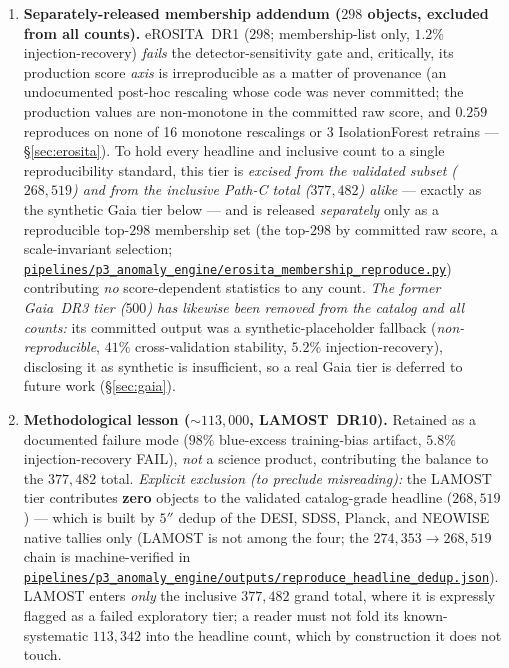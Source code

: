 \documentclass[aps,prd,twocolumn,superscriptaddress,showpacs,preprintnumbers,nofootinbib,longbibliography,floatfix]{revtex4-2}
\newcommand{\repoBase}{https://github.com/Hubify-Projects/bigbounce/blob/main}
\newcommand{\artifact}[1]{\href{\repoBase/#1}{\nolinkurl{#1}}}
\begin{document}
\begin{enumerate}[leftmargin=1.4em,topsep=2pt,itemsep=1pt]
over-representation, binomial $p = 5.5\times10^{-4}$, ruling out in-sample memorization inflation; see \S\ref{sec:planck} and the same held-out artifact), and NEOWISE (masking-geometry QA only, not a detector-sensitivity test; geometry-QA only, not detector-sensitivity injection test). \emph{These are the only numbers we recommend for downstream science.} No component here is claimed as an injection-recovery PASS unless explicitly stated (SDSS, Planck and DESI --- the last for its broad/extended anomaly class only --- are).
\item \textbf{Separately-released membership addendum ($298$ objects, excluded from all counts).} eROSITA~DR1 ($298$; membership-list only, $1.2\%$ injection-recovery) \emph{fails} the detector-sensitivity gate and, critically, its production score \emph{axis} is irreproducible as a matter of provenance (an undocumented post-hoc rescaling whose code was never committed; the production values are non-monotone in the committed raw score, and $0.259$ reproduces on none of 16 monotone rescalings or 3 IsolationForest retrains --- \S\ref{sec:erosita}). To hold every headline and inclusive count to a single reproducibility standard, this tier is \emph{excised from the validated subset ($268{,}519$) and from the inclusive Path-C total ($377{,}482$) alike} --- exactly as the synthetic Gaia tier below --- and is released \emph{separately} only as a reproducible top-$298$ membership set (the top-$298$ by committed raw score, a scale-invariant selection; \artifact{pipelines/p3\_anomaly\_engine/erosita\_membership\_reproduce.py}) contributing \emph{no} score-dependent statistics to any count. \emph{The former Gaia~DR3 tier ($500$) has likewise been removed from the catalog and all counts:} its committed output was a synthetic-placeholder fallback (\emph{non-reproducible}, $41\%$ cross-validation stability, $5.2\%$ injection-recovery), disclosing it as synthetic is insufficient, so a real Gaia tier is deferred to future work (\S\ref{sec:gaia}).
\item \textbf{Methodological lesson ($\sim\!113{,}000$, LAMOST~DR10).} Retained as a documented failure mode ($98\%$ blue-excess training-bias artifact, $5.8\%$ injection-recovery FAIL), \emph{not} a science product, contributing the balance to the $377{,}482$ total. \emph{Explicit exclusion (to preclude misreading):} the LAMOST tier contributes \textbf{zero} objects to the validated catalog-grade headline ($268{,}519$) --- which is built by $5''$ dedup of the DESI, SDSS, Planck, and NEOWISE native tallies only (LAMOST is not among the four; the $274{,}353 \to 268{,}519$ chain is machine-verified in \artifact{pipelines/p3\_anomaly\_engine/outputs/reproduce\_headline\_dedup.json}). LAMOST enters \emph{only} the inclusive $377{,}482$ grand total, where it is expressly flagged as a failed exploratory tier; a reader must not fold its known-systematic $113{,}342$ into the headline count, which by construction it does not touch.
\end{enumerate}
\end{document}
